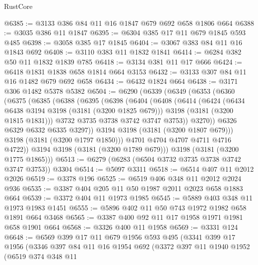\begin{lexlean}{RustCore}
\begin{coremodule}
@6385 := @3133 @386 @84 @11 @16 @1847 @679 @692 @658 @1806 @664
@6388 := @3035 @386 @11 @1847
@6395 := @6304 @385 @17 @11 @679 @1845 @593 @485
@6398 := @3058 @385 @17 @1845
@6404 := @3067 @383 @84 @11 @16 @1843 @692
@6408 := @3110 @383 @11 @1832 @1841
@6414 := @6284 @382 @50 @11 @1832 @1839 @785
@6418 := @3134 @381 @11 @17 @666
@6424 := @6418 @1831 @1838 @658 @1814 @664 @3153
@6432 := @3133 @307 @84 @11 @16 @1482 @679 @692 @658
@6434 := @6432 @1824 @664
@6438 := @3171 @306 @1482 @5378 @5382
@6504 := @6290
    (@6339
      (@6349
        (@6353
          (@6360
            (@6375
              (@6385
                (@6388
                  (@6395
                    (@6398
                      (@6404
                        (@6408
                          (@6414
                            (@6424
                              (@6434 @6438 @3194 @3198 (@3181 (@3200 @1825 @679)))
                              @3198
                              (@3181 (@3200 @1815 @1831)))
                            @3732
                            @3735
                            @3738
                            @3742
                            @3747
                            @3753))
                        @3270))
                    @6326
                    @6329
                    @6332
                    @6335
                    @3297))
                @3194
                @3198
                (@3181 (@3200 @1807 @679)))
              @3198
              (@3181 (@3200 @1797 @1850)))
            @4701
            @4704
            @4707
            @4711
            @4716
            @4722))
        @3194
        @3198
        (@3181 (@3200 @1789 @679)))
      @3198
      (@3181 (@3200 @1775 @1865)))
@6513 := @6279 (@6283 (@6504 @3732 @3735 @3738 @3742 @3747 @3753)) @3304
@6514 := @5097 @3311
@6518 := @6514 @407 @11 @2012 @2026
@6519 := @3378 @196
@6525 := @6519 @406 @348 @11 @2012 @2024 @936
@6535 := @3387 @404 @205 @11 @50 @1987 @2011 @2023 @658 @1883 @664
@6539 := @3372 @404 @11 @1973 @1985
@6545 := @5889 @403 @348 @11 @1973 @1983 @1451
@6555 := @5896 @402 @11 @50 @743 @1972 @1982 @658 @1891 @664 @3468
@6565 := @3387 @400 @92 @11 @17 @1958 @1971 @1981 @658 @1901 @664
@6568 := @3326 @400 @11 @1958
@6569 := @3331 @124
@6648 := @6569
    @399
    @17
    @11
    @679
    @1956
    @593
    @495
    (@3341
      @399
      @17
      @1956
      (@3346
        @397
        @84
        @11
        @16
        @1954
        @692
        (@3372
          @397
          @11
          @1940
          @1952
          (@6519
            @374
            @348
            @11

\end{coremodule}
\end{lexlean}
